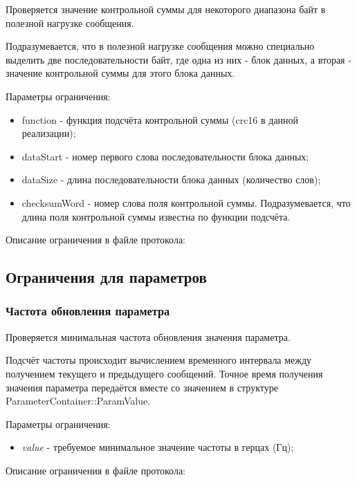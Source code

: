 Проверяется значение контрольной суммы для некоторого диапазона байт в полезной 
нагрузке сообщения.

Подразумевается, что в полезной нагрузке сообщения можно специально выделить 
две последовательности байт, где одна из них - блок данных, а вторая - значение 
контрольной суммы для этого блока данных.

Параметры ограничения:

\begin{itemize}
 \item function - функция подсчёта контрольной суммы (crc16 в данной 
реализации);
 \item dataStart - номер первого слова последовательности блока данных;
 \item dataSize - длина последовательности блока данных (количество слов);
 \item checksumWord - номер слова поля контрольной суммы. 
Подразумевается, что длина поля контрольной суммы известна по функции подсчёта.
\end{itemize}

Описание ограничения в файле протокола:



\subsection{Ограничения для параметров}
\label{subsec:param_restricts}

\subsubsection{Частота обновления параметра}

Проверяется минимальная частота обновления значения параметра.

Подсчёт частоты происходит вычислением временного интервала между получением 
текущего и предыдущего сообщений. Точное время получения значения
параметра передаётся вместе со значением в структуре 
ParameterContainer::ParamValue.

Параметры ограничения:

\begin{itemize}
 \item \textit{value} - требуемое минимальное значение частоты в герцах (Гц);
\end{itemize}

Описание ограничения в файле протокола:

